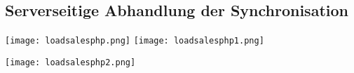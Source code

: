 \subsection{Serverseitige Abhandlung der Synchronisation}
\label{app:loadsalesphp}
\begin{center}
\texttt{[image: loadsalesphp.png]}
\texttt{[image: loadsalesphp1.png]}
\end{center}
\begin{center}
\texttt{[image: loadsalesphp2.png]}
\end{center}